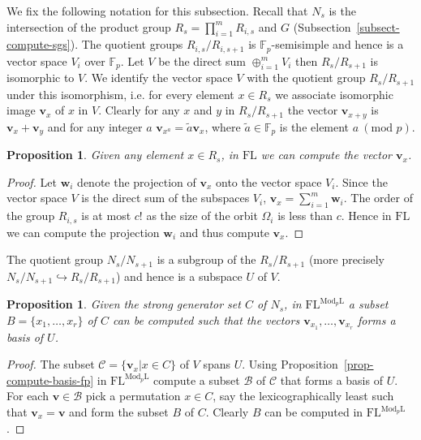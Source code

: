 \documentclass[11pt]{madras}%
\newtheorem{proposition}[theorem]{Proposition}
\theoremstyle{remark}
\newcommand{\ModkL}[1]{{\ensuremath{\mathrm{Mod}_{#1}\mathrm{L}}}}
\begin{document}
We fix the following notation for this subsection. Recall that $N_s$
is the intersection of the product group $R_s = \prod_{i=1}^m R_{i,s}$
and $G$ (Subsection~\ref{subsect-compute-sgs}). The quotient groups
$R_{i,s}/R_{i,s+1}$ is $\mathbb{F}_p$-semisimple and hence is a vector
space $V_i$ over $\mathbb{F}_p$. Let $V$ be the direct sum
$\oplus_{i=1}^m V_i$ then $R_s/R_{s+1}$ is isomorphic to $V$. We
identify the vector space $V$ with the quotient group $R_s/R_{s+1}$
under this isomorphism, i.e. for every element $x \in R_s$ we
associate isomorphic image $\mathbf{v}_x$ of $x$ in $V$. Clearly for
any $x$ and $y$ in $R_s/R_{s+1}$ the vector $\mathbf{v}_{x+y}$ is
$\mathbf{v}_x + \mathbf{v}_y$ and for any integer $a$
$\mathbf{v}_{x^a} = \tilde{a} \mathbf{v}_x$, where $\tilde{a} \in
\mathbb{F}_p$ is the element $a\ (\textrm{mod } p)$.

\begin{proposition}
  Given any element $x \in R_s$, in $\mathrm{FL}$ we can compute the
  vector $\mathbf{v}_x$.
\end{proposition}
\begin{proof}
  Let $\mathbf{w}_i$ denote the projection of $\mathbf{v}_x$ onto the
  vector space $V_i$.  Since the vector space $V$ is the direct sum of
  the subspaces $V_i$, $\mathbf{v}_x = \sum_{i=1}^m \mathbf{w}_i$.
  The order of the group $R_{i,s}$ is at most $c!$ as the size of the
  orbit $\Omega_i$ is less than $c$. Hence in $\mathrm{FL}$ we can
  compute the projection $\mathbf{w}_i$ and thus compute
  $\mathbf{v}_x$.
\end{proof} 

The quotient group $N_s/N_{s+1}$ is a subgroup of the $R_s/R_{s+1}$
(more precisely $N_s/N_{s+1} \hookrightarrow R_s/R_{s+1}$) and hence
is a subspace $U$ of $V$. 

\begin{proposition}\label{prop-compute-basis-U}
  Given the strong generator set $C$ of $N_s$, in
  $\mathrm{FL}^{\ModkL{p}}$ a subset $B = \{x_1,\ldots,x_r \}$ of $C$
  can be computed such that the vectors
  $\mathbf{v}_{x_1},\ldots,\mathbf{v}_{x_r}$ forms a basis of $U$.
\end{proposition}
\begin{proof}
  The subset $\mathcal{C} = \{ \mathbf{v}_x | x \in C \}$ of $V$ spans
  $U$.  Using Proposition~\ref{prop-compute-basis-fp} in
  $\mathrm{FL}^{\ModkL{p}}$ compute a subset $\mathcal{B}$ of
  $\mathcal{C}$ that forms a basis of $U$. For each $\mathbf{v} \in
  \mathcal{B}$ pick a permutation $x \in C$, say the lexicographically
  least such that $\mathbf{v}_x = \mathbf{v}$ and form the subset $B$
  of $C$. Clearly $B$ can be computed in $\mathrm{FL}^{\ModkL{p}}$.
\end{proof}
\end{document}
